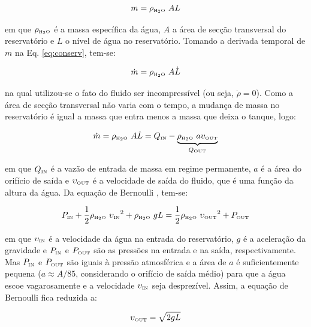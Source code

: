 \begin{equation}\label{eq:conserv}
m = \rho_{\tiny \text{\tiny H}_2\text{\tiny O}}\ AL
\end{equation}

\noindent em que $\rho_{\tiny \text{\tiny H}_2\text{\tiny O}}$ é a massa
específica da água, $A$ a área de secção transversal do reservatório e $L$ o
nível de água no reservatório. Tomando a derivada temporal de $m$ na Eq.
\ref{eq:conserv}, tem-se:

\begin{equation}
\dot{m} = \rhoagua\ A\dot{L}
\end{equation}

\noindent na qual utilizou-se o fato do fluido ser incompressível (ou seja,
$\dot{\rho} = 0$). Como a área de secção transversal não varia com o tempo, a
mudança de massa no reservatório é igual a massa que entra menos a massa que
deixa o tanque, logo:
 
\begin{equation}\label{eq:mudanca_massa}
\dot{m} = \rho_{\tiny \text{\tiny H}_2\text{\tiny O}}\ A\dot{L} = 
            Q_{\text{\tiny IN}} - 
\underbrace{\rho_{\tiny \text{\tiny H}_2\text{\tiny O}}\ a\upsilon_{\text{\tiny OUT}}}_
           {Q_{\text{\tiny OUT}}}
\end{equation}

\noindent em que $Q_{\text{\tiny IN}}$ é a vazão de entrada de massa em regime
permanente, $a$ é a área do orifício de saída e $\upsilon_{\text{\tiny OUT}}$ é
a velocidade de saída do fluido, que é uma função da altura da água. Da equação
de Bernoulli \cite{houghton:2002}, tem-se:

\begin{equation}
P_{\text{\tiny IN}} + 
\frac{1}{2}\rho_{\tiny \text{\tiny H}_2\text{\tiny O}}\ {\upsilon_{\text{\tiny IN}}}^2 +
\rho_{\tiny \text{\tiny H}_2\text{\tiny O}}\ gL
=
\frac{1}{2}\rho_{\tiny \text{\tiny H}_2\text{\tiny O}}\ {\upsilon_{\text{\tiny OUT}}}^2 +
P_{\text{\tiny OUT}}
\end{equation}

\noindent em que $\upsilon_{\text{\tiny IN}}$ é a velocidade da água na entrada
do reservatório, $g$ é a aceleração da gravidade e $P_{\text{\tiny IN}}$ e
$P_{\text{\tiny OUT}}$ são as pressões na entrada e na saída, respectivamente.
Mas $P_{\text{\tiny IN}}$ e $P_{\text{\tiny OUT}}$ são iguais à pressão
atmosférica e a área de $a$ é suficientemente pequena ($a \approx A/85$,
considerando o orifício de saída médio) para que a água escoe vagarosamente e a
velocidade $\upsilon_{\text{\tiny IN}}$ seja desprezível. Assim, a equação de
Bernoulli fica reduzida a:

\begin{equation}\label{eq:bernoulli_red}
\upsilon_{\text{\tiny OUT}} = \sqrt{2gL}
\end{equation}

